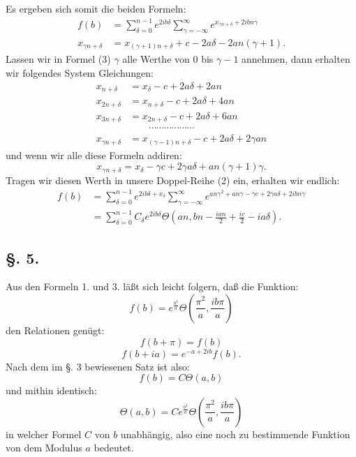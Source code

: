 \documentclass[10pt]{article}
\newcommand{\sourceanchor}[1]{\hypertarget{source-#1}{}}
\begin{document}
Es ergeben sich somit die beiden Formeln:
\begin{align}
 f(b)&=\sum_{\delta=0}^{n-1}e^{2ib\delta}\sum_{\gamma=-\infty}^{\infty}e^{x_{\gamma n+\delta}+2ibn\gamma} \tag{2}\\
 x_{\gamma n+\delta}&=x_{(\gamma+1)n+\delta}+c-2a\delta-2an(\gamma+1). \tag{3}
\end{align}
Lassen wir in Formel (3) \(\gamma\) alle Werthe von 0 bis \(\gamma-1\) annehmen, dann erhalten wir folgendes System Gleichungen:
\begin{align*}
 x_{n+\delta}&=x_{\delta}-c+2a\delta+2an\\
 x_{2n+\delta}&=x_{n+\delta}-c+2a\delta+4an\\
 x_{3n+\delta}&=x_{2n+\delta}-c+2a\delta+6an\\
 &\hspace{2em}\cdots\cdots\cdots\cdots\cdots\cdots\\
 x_{\gamma n+\delta}&=x_{(\gamma-1)n+\delta}-c+2a\delta+2\gamma an
\end{align*}
und wenn wir alle diese Formeln addiren:
\[
x_{\gamma n+\delta}=x_{\delta}-\gamma c+2\gamma a\delta+an(\gamma+1)\gamma.
\]
Tragen wir diesen Werth in unsere Doppel-Reihe (2) ein, erhalten wir endlich:
\begin{align*}
 f(b)&=\sum_{\delta=0}^{n-1}e^{2ib\delta+x_{\delta}}\sum_{\gamma=-\infty}^{\infty}e^{an\gamma^{2}+an\gamma-\gamma c+2\gamma a\delta+2ibn\gamma}\\
 &=\sum_{\delta=0}^{n-1}C_{\delta}e^{2ib\delta}\Theta\!\left(an,bn-\frac{ian}{2}+\frac{ic}{2}-ia\delta\right).
\end{align*}

\sourceanchor{PA06}
\subsection*{\S. 5.}
Aus den Formeln 1. und 3. läßt sich leicht folgern, daß die Funktion:
\[
f(b)=e^{\frac{b^{2}}{a}}\Theta\!\left(\frac{\pi^{2}}{a},\frac{ib\pi}{a}\right)
\]
den Relationen genügt:
\[
f(b+\pi)=f(b)
\]
\[
f(b+ia)=e^{-a+2ib}f(b).
\]
Nach dem im \S. 3 bewiesenen Satz ist also:
\[
f(b)=C\Theta(a,b)
\]
und mithin identisch:
\begin{equation*}
\Theta(a,b)=C e^{\frac{b^{2}}{a}}\Theta\!\left(\frac{\pi^{2}}{a},\frac{ib\pi}{a}\right)
\tag{1}
\end{equation*}
in welcher Formel \(C\) von \(b\) unabhängig, also eine noch zu bestimmende Funktion von dem Modulus \(a\) bedeutet.
\end{document}

